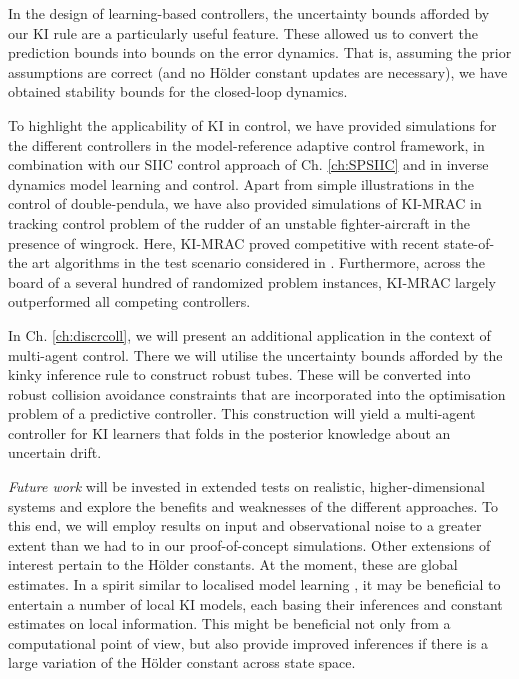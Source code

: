 In the design of learning-based controllers, the uncertainty bounds afforded by our KI rule are a particularly useful feature. These allowed us to convert the prediction bounds into bounds on the error dynamics. That is, assuming the prior assumptions are correct (and no H\"older constant updates are necessary),  we have obtained stability bounds for the closed-loop dynamics. 



To highlight the applicability of KI in control, we have provided simulations for the different controllers in the model-reference adaptive control framework, in combination with our SIIC control approach of Ch. \ref{ch:SPSIIC} and in inverse dynamics model learning and control. Apart from simple illustrations in the control of double-pendula, we have also provided simulations of KI-MRAC in tracking control problem of the rudder of an unstable fighter-aircraft in the presence of wingrock. Here, KI-MRAC proved competitive with recent state-of-the art algorithms in the test scenario considered in \cite{Chowdhary2013,ChowdharyCDC2013,chowdharyacc2013}. Furthermore, across the board of a several hundred of randomized problem instances, KI-MRAC largely outperformed all competing controllers. 

In Ch. \ref{ch:discrcoll}, we will present an additional application in the context of multi-agent control. There we will utilise the uncertainty bounds afforded by the kinky inference rule to construct robust tubes. These will be converted into robust collision avoidance constraints that are incorporated into the optimisation problem of a predictive controller. This construction will yield a multi-agent controller for KI learners that folds in the posterior knowledge about an uncertain drift.

\textit{Future work} will be invested in extended tests on realistic, higher-dimensional systems and explore the benefits and weaknesses of the different approaches. To this end, we will employ results on input and observational noise to a greater extent than we had to in our proof-of-concept simulations. 
Other extensions of interest pertain to the H\"older constants. At the moment, these are global estimates. In a spirit similar to localised model learning \cite{lwpr2000,TuongSeegerPeters2009}, it may be beneficial to entertain a number of local KI models, each basing their inferences and constant estimates on local information. This might be beneficial not only from a computational point of view, but also provide improved inferences if there is a large variation of the H\"older constant across state space.

